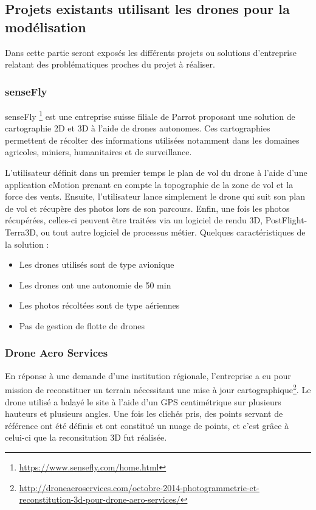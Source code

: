 \documentclass[12pt, openany]{report}
\begin{document}
\subsection{Projets existants utilisant les drones pour la modélisation}
Dans cette partie seront exposés les différents projets ou solutions d'entreprise relatant des problématiques proches du projet à réaliser.

\subsubsection{senseFly}
senseFly \footnote{\url{https://www.sensefly.com/home.html}} est une entreprise suisse filiale de Parrot proposant une solution de cartographie 2D et 3D à l'aide de drones autonomes. Ces cartographies permettent de récolter des informations utilisées notamment dans les domaines agricoles, miniers, humanitaires et de surveillance.

L'utilisateur définit dans un premier temps le plan de vol du drone à l'aide d'une application eMotion prenant en compte la topographie de la zone de vol et la force des vents. Ensuite, l'utilisateur lance simplement le drone qui suit son plan de vol et récupère des photos lors de son parcours. Enfin, une fois les photos récupérées, celles-ci peuvent être traitées via un logiciel de rendu 3D, PostFlight-Terra3D, ou tout autre logiciel de processus métier. Quelques caractéristiques de la solution :
\begin{itemize}
\item Les drones utilisés sont de type avionique
\item Les drones ont une autonomie de 50 min
\item Les photos récoltées sont de type aériennes
\item Pas de gestion de flotte de drones
\end{itemize}

\subsubsection{Drone Aero Services}
En réponse à une demande d'une institution régionale, l'entreprise a eu pour mission de reconstituer un terrain nécessitant une mise à jour cartographique\footnote{\url{http://droneaeroservices.com/octobre-2014-photogrammetrie-et-reconstitution-3d-pour-drone-aero-services/}}. Le drone utilisé a balayé le site à l'aide d'un GPS centimétrique sur plusieurs hauteurs et plusieurs angles. Une fois les clichés pris, des points servant de référence ont été définis et ont constitué un nuage de points, et c'est grâce à celui-ci que la reconsitution 3D fut réalisée.
\end{document}
